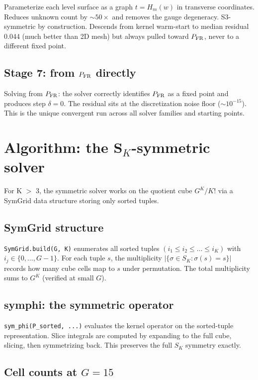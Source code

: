 \documentclass[11pt]{article}
\newcommand{\1}{\mathbf{1}}
\newcommand{\PFR}{P_{\rm FR}}
\begin{document}
Parameterize each level surface as a graph $t = H_m(w)$ in transverse
coordinates.  Reduces unknown count by $\sim 50\times$ and removes the
gauge degeneracy.  S3-symmetric by construction.  Descends from kernel
warm-start to median residual 0.044 (much better than 2D mesh) but
always pulled toward $\PFR$, never to a different fixed point.

\subsection{Stage 7: from $\PFR$ directly}

Solving from $\PFR$: the solver correctly identifies $\PFR$ as a fixed
point and produces step $\delta = 0$.  The residual sits at the
discretization noise floor ($\sim 10^{-15}$).  This is the unique
convergent run across all solver families and starting points.

\section{Algorithm: the S$_K$-symmetric solver}
\label{app:sym}

For K $>$ 3, the symmetric solver works on the quotient cube
$G^K / K!$ via a SymGrid data structure storing only sorted tuples.

\subsection{SymGrid structure}

\texttt{SymGrid.build(G, K)} enumerates all sorted tuples $(i_1 \le i_2
\le \ldots \le i_K)$ with $i_j \in \{0, \ldots, G-1\}$.  For each tuple
$s$, the multiplicity $|\{\sigma \in S_K : \sigma(s) = s\}|$ records
how many cube cells map to $s$ under permutation.  The total
multiplicity sums to $G^K$ (verified at small $G$).

\subsection{symphi: the symmetric operator}

\texttt{sym\_phi(P\_sorted, ...)} evaluates the kernel operator on the
sorted-tuple representation.  Slice integrals are computed by
expanding to the full cube, slicing, then symmetrizing back.  This
preserves the full $S_K$ symmetry exactly.

\subsection{Cell counts at $G=15$}
\end{document}
